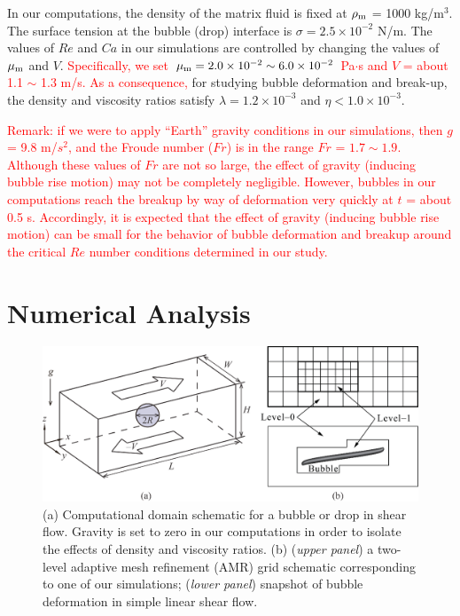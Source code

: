 \documentclass{elsarticle}
\begin{document}
\par
In our computations, the density of the matrix fluid is fixed at $\rho_{\rm m}$ = 1000 kg/m$^3$.  The surface tension at the bubble (drop) interface is $\sigma =2.5 \times 10^{-2}$ N/m. The values of $Re$ and $Ca$ in our simulations are controlled by changing the values of $\mu_{\rm m}$ and $V$.  
\textcolor{red}
{
Specifically, we set $\mu_{\rm m} = 2.0 \times 10^{-2} \sim 6.0 \times 10^{-2}$ Pa$\cdot$s and
$V$ = about 1.1 $\sim$ 1.3 m/s.
As a consequence, 
}
for studying bubble deformation and break-up, the density and viscosity ratios satisfy
$\lambda = 1.2 \times 10^{-3}$ and $\eta < 1.0 \times 10^{-3}$.
\par
\textcolor{red}
{
Remark: if we were to apply ``Earth'' gravity conditions in our simulations, then $g$ = 9.8 m/$s^{2}$,  and the Froude number ($Fr$) is in the range $Fr$ = $1.7 \sim 1.9$.  Although these values of $Fr$ are not so large, the effect of gravity (inducing bubble rise motion) may not be completely negligible.  However, bubbles in our computations reach the breakup by way of deformation very quickly at $t$ = about 0.5 s.  Accordingly, it is expected that the effect of gravity (inducing bubble rise motion) can be small for the behavior of bubble deformation and breakup around the critical $Re$ number conditions determined in our study.  }

\section{Numerical Analysis}
% 
\begin{figure}%
  \centering
  \includegraphics[scale=0.4]{Figure/1-SchematicAndGrid}
  \caption{(a) Computational domain schematic for a bubble or drop in shear 
           flow.  Gravity is set to zero in our computations in order to isolate
           the effects of density and viscosity ratios.  
           (b) (\textit{upper panel}) a two-level adaptive mesh 
           refinement (AMR) grid schematic corresponding to one of our
           simulations;
           (\textit{lower panel}) snapshot of bubble deformation 
           in simple linear shear flow.}
  \label{fig:SchemAndGrid}
\end{figure}
%
\end{document}
